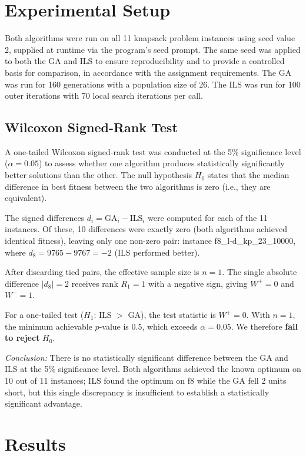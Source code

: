 \documentclass{article}
\begin{document}
\section{Experimental Setup}

Both algorithms were run on all 11 knapsack problem instances using seed value 2, supplied at runtime via the program's seed prompt. The same seed was applied to both the GA and ILS to ensure reproducibility and to provide a controlled basis for comparison, in accordance with the assignment requirements. The GA was run for 160 generations with a population size of 26. The ILS was run for 100 outer iterations with 70 local search iterations per call.

\subsection*{Wilcoxon Signed-Rank Test}

A one-tailed Wilcoxon signed-rank test was conducted at the 5\% significance level ($\alpha = 0.05$) to assess whether one algorithm produces statistically significantly better solutions than the other. The null hypothesis $H_0$ states that the median difference in best fitness between the two algorithms is zero (i.e., they are equivalent).

The signed differences $d_i = \text{GA}_i - \text{ILS}_i$ were computed for each of the 11 instances. Of these, 10 differences were exactly zero (both algorithms achieved identical fitness), leaving only one non-zero pair: instance f8\_l-d\_kp\_23\_10000, where $d_8 = 9765 - 9767 = -2$ (ILS performed better).

After discarding tied pairs, the effective sample size is $n = 1$. The single absolute difference $|d_8| = 2$ receives rank $R_1 = 1$ with a negative sign, giving $W^{+} = 0$ and $W^{-} = 1$.

For a one-tailed test ($H_1$: ILS $>$ GA), the test statistic is $W^{+} = 0$. With $n = 1$, the minimum achievable $p$-value is $0.5$, which exceeds $\alpha = 0.05$. We therefore \textbf{fail to reject} $H_0$.

\textit{Conclusion:} There is no statistically significant difference between the GA and ILS at the 5\% significance level. Both algorithms achieved the known optimum on 10 out of 11 instances; ILS found the optimum on f8 while the GA fell 2 units short, but this single discrepancy is insufficient to establish a statistically significant advantage.

\section{Results}
\end{document}

